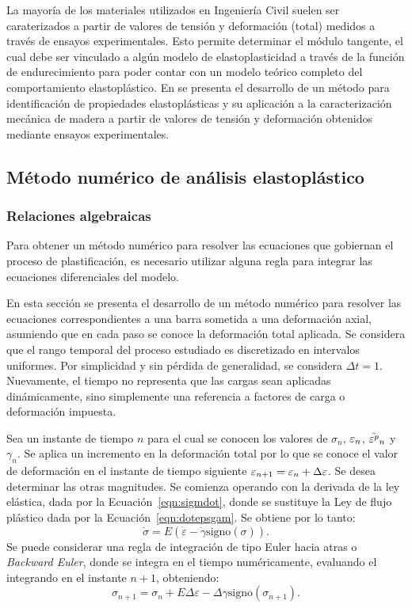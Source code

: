 La mayoría de los materiales utilizados en Ingeniería Civil suelen ser caraterizados a partir de valores de tensión y deformación (total) medidos a través de ensayos experimentales. %
%
Esto permite determinar el módulo tangente, el cual debe ser vinculado a algún modelo de elastoplasticidad a través de la función de endurecimiento para poder contar con un modelo teórico completo del comportamiento elastoplástico. %
%
En \citep{PerezZerpa2017} se presenta el desarrollo de un método para identificación de propiedades elastoplásticas y su aplicación a la caracterización mecánica de madera a partir de valores de tensión y deformación obtenidos mediante ensayos experimentales.


\subsection{Método numérico de análisis elastoplástico}

\subsubsection{Relaciones algebraicas}

Para obtener un método numérico para resolver las ecuaciones que gobiernan el proceso de plastificación, es necesario utilizar alguna regla para integrar las ecuaciones diferenciales del modelo. %

En esta sección se presenta el desarrollo de un método numérico para resolver las ecuaciones correspondientes a una barra sometida a una deformación axial, asumiendo que en cada paso se conoce la deformación total aplicada. %
%
Se considera que el rango temporal del proceso estudiado es discretizado en intervalos uniformes. Por simplicidad y sin pérdida de generalidad, se considera $\Delta t=1 $. %
%
Nuevamente, el tiempo no representa que las cargas sean aplicadas dinámicamente, sino simplemente una referencia a factores de carga o deformación impuesta.

Sea un instante de tiempo $n$ para el cual se conocen los valores de $\sigma_n$, $\varepsilon_n$, $\bar{ \varepsilon^p}_n$ y $\gamma_n$. %
%
Se aplica un incremento en la deformación total por lo que se conoce el valor de deformación en el instante de tiempo siguiente $\varepsilon_{n+1} = \varepsilon_n  + \Delta \varepsilon$. %
%
Se desea determinar las otras magnitudes. Se comienza operando con la derivada de la ley elástica, dada por la Ecuación~\eqref{eqn:sigmdot}, donde se sustituye la Ley de flujo plástico dada por la Ecuación~\eqref{eqn:dotepsgam}. %
%
Se obtiene por lo tanto:
%
\begin{equation}
\dot{ \sigma} = E \left( \dot{ \varepsilon} - \dot{\gamma} \text{signo}(\sigma) \right).
\end{equation}
%
Se puede considerar una regla de integración de tipo Euler hacia atras o \textit{Backward Euler}, donde se integra  en el tiempo numéricamente, evaluando el integrando en el instante $n+1$, obteniendo:
%
\begin{equation}
\sigma_{n+1}  =  \sigma_n + E \Delta \varepsilon - \Delta \gamma \text{signo}(\sigma_{n+1} ).
\end{equation}

